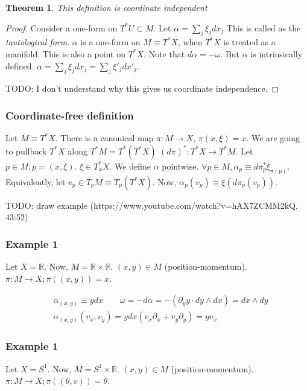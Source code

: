 \documentclass[11pt]{book}
\newcommand{\R}{\ensuremath{\mathbb R}}
\newtheorem{theorem}{Theorem}
\newtheorem{proof}[theorem]{Proof}
\begin{document}
\begin{theorem}
     This definition is coordinate independent
 \end{theorem}
 \begin{proof}
     Consider a one-form on $T^*U \subset M$. Let $\alpha = \sum_j \xi_j dx_j$ 
     This is called as the \emph{tautological form}.
     $\alpha$ is a one-form on $M \equiv T^*X$, when $T^*X$ is treated as a manifold.
     This is also a point on $T^* X$.
     Note that $d \alpha = - \omega$. But $\alpha$ is intrinsically defined.
     $\alpha =  \sum_j \xi_j dx_j = \sum_j \xi'_j dx'_j$.

     TODO: I don't understand why this gives us coordinate independence.
 \end{proof}

\subsubsection{Coordinate-free definition}

Let $M \equiv T^* X$. There is a canonical map $\pi: M \rightarrow X$, 
$\pi(x, \xi) = x$. We are going to pullback $T^* X$ along $T^* M = T^* (T^* X)$
$(d\pi)^*: T^*X \rightarrow T^*M$.
Let $p \in M; p = (x, \xi)$. $\xi \in T_x^* X$.
We define $\alpha$ pointwise. $\forall p \in M, \alpha_p \equiv  d\pi_p^* \xi_{\pi(p)}$.
Equivalently, let $v_p \in T_p M \equiv T_p (T^*X)$. Now, $\alpha_p (v_p) \equiv \xi( d\pi_p (v_p))$.

TODO: draw example (https://www.youtube.com/watch?v=hAX7ZCMM2kQ, 43:52)

\subsubsection{Example 1}
Let $X = \R$. Now, $M = \R \times \R$. $(x, y) \in M$ (position-momentum).
$\pi: M \rightarrow X; \pi((x, y)) = x$.

\begin{align*}
&\alpha_{(x, y)} \equiv y dx 
\qquad \omega = -d\alpha = - (\partial_y y \cdot dy \wedge dx) = dx \wedge dy \\
&\alpha_{(x, y)}(v_x, v_y) = y dx (v_x \partial_x + v_y \partial_y) = y v_x
\end{align*}


\subsubsection{Example 1}
Let $X = S^1$. Now, $M = S^1 \times \R$. $(x, y) \in M$ (position-momentum).
$\pi: M \rightarrow X; \pi((\theta, v)) = \theta$.
\end{document}
